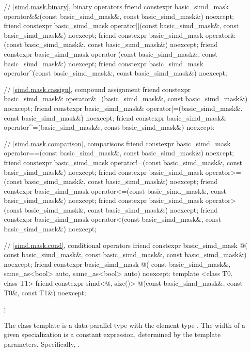 \begin{codeblock}
{  // \ref{simd.mask.binary},  binary operators
  friend constexpr basic_simd_mask
    operator&&(const basic_simd_mask&, const basic_simd_mask&) noexcept;
  friend constexpr basic_simd_mask
    operator||(const basic_simd_mask&, const basic_simd_mask&) noexcept;
  friend constexpr basic_simd_mask
    operator&(const basic_simd_mask&, const basic_simd_mask&) noexcept;
  friend constexpr basic_simd_mask
    operator|(const basic_simd_mask&, const basic_simd_mask&) noexcept;
  friend constexpr basic_simd_mask
    operator^(const basic_simd_mask&, const basic_simd_mask&) noexcept;

  // \ref{simd.mask.cassign},  compound assignment
  friend constexpr basic_simd_mask&
    operator&=(basic_simd_mask&, const basic_simd_mask&) noexcept;
  friend constexpr basic_simd_mask&
    operator|=(basic_simd_mask&, const basic_simd_mask&) noexcept;
  friend constexpr basic_simd_mask&
    operator^=(basic_simd_mask&, const basic_simd_mask&) noexcept;

  // \ref{simd.mask.comparison},  comparisons
  friend constexpr basic_simd_mask
    operator==(const basic_simd_mask&, const basic_simd_mask&) noexcept;
  friend constexpr basic_simd_mask
    operator!=(const basic_simd_mask&, const basic_simd_mask&) noexcept;
  friend constexpr basic_simd_mask
    operator>=(const basic_simd_mask&, const basic_simd_mask&) noexcept;
  friend constexpr basic_simd_mask
    operator<=(const basic_simd_mask&, const basic_simd_mask&) noexcept;
  friend constexpr basic_simd_mask
    operator>(const basic_simd_mask&, const basic_simd_mask&) noexcept;
  friend constexpr basic_simd_mask
    operator<(const basic_simd_mask&, const basic_simd_mask&) noexcept;

  // \ref{simd.mask.cond},  conditional operators
  friend constexpr basic_simd_mask @\simdselect@(
    const basic_simd_mask&, const basic_simd_mask&, const basic_simd_mask&) noexcept;
  friend constexpr basic_simd_mask @\simdselect@(
    const basic_simd_mask&, same_as<bool> auto, same_as<bool> auto) noexcept;
  template <class T0, class T1>
    friend constexpr simd<@\seebelow@, size()>
      @\simdselect@(const basic_simd_mask&, const T0&, const T1&) noexcept;
};
\end{codeblock}

\pnum
The class template  is a data-parallel type with the element type . The width of a given  specialization is a constant expression, determined by the template parameters. Specifically, .


